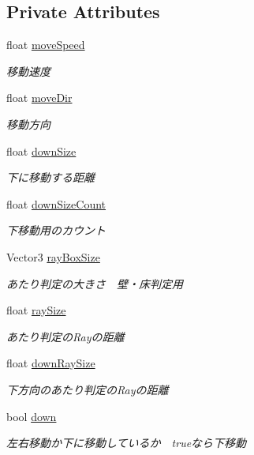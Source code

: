 \subsection*{Private Attributes}
\begin{DoxyCompactItemize}
\item 
float \hyperlink{class_angel_ae28f9d3c6935246d9ed7c3ed62ea0d82}{move\+Speed}
\begin{DoxyCompactList}\small\item\em 移動速度 \end{DoxyCompactList}\item 
float \hyperlink{class_angel_a316911b3b4c0034240c0439b44170b58}{move\+Dir}
\begin{DoxyCompactList}\small\item\em 移動方向 \end{DoxyCompactList}\item 
float \hyperlink{class_angel_ad00352b901921315a4215ddd5c7c57d7}{down\+Size}
\begin{DoxyCompactList}\small\item\em 下に移動する距離 \end{DoxyCompactList}\item 
float \hyperlink{class_angel_aa7e9bed085ef4689c03e5c7ef8e4ac1d}{down\+Size\+Count}
\begin{DoxyCompactList}\small\item\em 下移動用のカウント \end{DoxyCompactList}\item 
Vector3 \hyperlink{class_angel_a3305075149f7d8004650479c64efde44}{ray\+Box\+Size}
\begin{DoxyCompactList}\small\item\em あたり判定の大きさ　壁・床判定用 \end{DoxyCompactList}\item 
float \hyperlink{class_angel_acd83f4f3c29ee3349e5ed2eeaf30c764}{ray\+Size}
\begin{DoxyCompactList}\small\item\em あたり判定の\+Rayの距離 \end{DoxyCompactList}\item 
float \hyperlink{class_angel_a492ff7c5e75a13f60acdf6bdb9439194}{down\+Ray\+Size}
\begin{DoxyCompactList}\small\item\em 下方向のあたり判定の\+Rayの距離 \end{DoxyCompactList}\item 
bool \hyperlink{class_angel_abfa2f6dea626f6587c6dc2509cb8df26}{down}
\begin{DoxyCompactList}\small\item\em 左右移動か下に移動しているか　trueなら下移動 \end{DoxyCompactList}\end{DoxyCompactItemize}
